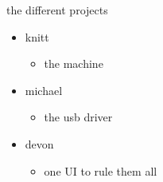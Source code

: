 \documentclass{beamer}
\begin{document}
\begin{frame}{the different projects}
    \begin{itemize}
        \item knitt
        \begin{itemize}
            \item the machine
        \end{itemize}

        \item michael
        \begin{itemize}
            \item the usb driver
        \end{itemize}

        \item devon
        \begin{itemize}
            \item one UI to rule them all
        \end{itemize}
      \end{itemize}
\end{frame}
\end{document}
